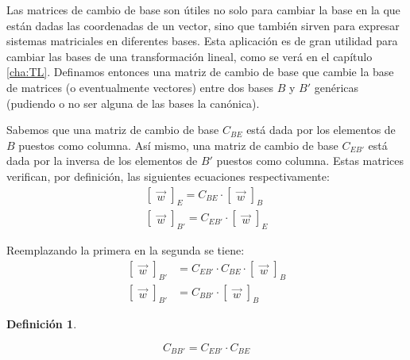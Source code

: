 \documentclass[a5paper,12pt,twoside]{book}
\newtheorem{defn}{{Definición}}[chapter]
\begin{document}
Las  matrices de cambio de base son útiles no solo para cambiar la base en la que están dadas las coordenadas de un vector, sino que también sirven para expresar sistemas matriciales en diferentes bases. Esta aplicación es de gran utilidad para cambiar las bases de una transformación lineal, como se verá en el capítulo \ref{cha:TL}. Definamos entonces una matriz de cambio de base que cambie la base de matrices (o eventualmente vectores) entre dos bases $B$ y $B'$ genéricas (pudiendo o no ser alguna de las bases la canónica).

Sabemos que una matriz de cambio de base $C_{BE}$ está dada por los elementos de $B$ puestos como columna. Así mismo, una matriz de cambio de base $C_{EB'}$ está dada por la inversa de los elementos de $B'$ puestos como columna. Estas matrices verifican, por definición, las siguientes ecuaciones respectivamente:
\begin{gather*}
    \begin{bmatrix}
        \Vec{w}
    \end{bmatrix}_E
    = C_{BE} \cdot
    \begin{bmatrix}
        \Vec{w}
    \end{bmatrix}_B
    \\[1ex]
    \begin{bmatrix}
        \Vec{w}
    \end{bmatrix}_{B'}
    = C_{EB'} \cdot
    \begin{bmatrix}
        \Vec{w}
    \end{bmatrix}_E
\end{gather*}

Reemplazando la primera en la segunda se tiene:
\begin{align*}
    \begin{bmatrix}
        \Vec{w}
    \end{bmatrix}_{B'}
    &= C_{EB'} \cdot C_{BE} \cdot
    \begin{bmatrix}
        \Vec{w}
    \end{bmatrix}_B
    \\[1ex]
    \begin{bmatrix}
        \Vec{w}
    \end{bmatrix}_{B'}
    &= C_{BB'} \cdot
    \begin{bmatrix}
        \Vec{w}
    \end{bmatrix}_B
\end{align*}

\begin{mdframed}[style=MyFrame1]
    \begin{defn}
        \label{defn:C_BB'}
    \end{defn}
    \begin{equation*}
        C_{BB'} = C_{EB'} \cdot C_{BE}
    \end{equation*}
\end{mdframed}
\end{document}
